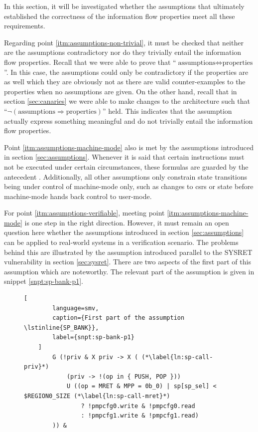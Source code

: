 In this section, it will be investigated whether the assumptions that ultimately established the correctness of the information flow properties meet all these requirements.

Regarding point \ref{itm:assumptions-non-trivial}, it must be checked that neither are the assumptions contradictory nor do they trivially entail the information flow properties.
Recall that we were able to prove that \enquote{$ \text{assumptions} \Leftrightarrow \text{properties} $}.
In this case, the assumptions could only be contradictory if the properties are as well which they are obviously not as there are valid counter-examples to the properties when no assumptions are given.
On the other hand, recall that in section \ref{sec:canaries} we were able to make changes to the architecture such that \enquote{$ \neg(\text{assumptions} \Rightarrow \text{properties}) $} held.
This indicates that the assumption actually express something meaningful and do not trivially entail the information flow properties.

Point \ref{itm:assumptions-machine-mode} also is met by the assumptions introduced in section \ref{sec:assumptions}.
Whenever it is said that certain instructions must not be executed under certain circumstances, these formulas are guarded by the antecedent .
Additionally, all other assumptions only constrain state transitions being under control of machine-mode only, such as changes to \glspl{csr} or state before machine-mode hands back control to user-mode.

For point \ref{itm:assumptions-verifiable}, meeting point \ref{itm:assumptions-machine-mode} is one step in the right direction.
However, it must remain an open question here whether the assumptions introduced in section \ref{sec:assumptions} can be applied to real-world systems in a verification scenario.
The problems behind this are illustrated by the  assumption introduced parallel to the SYSRET vulnerability in section \ref{sec:sysret}.
There are two aspects of the first part of this assumption which are noteworthy.
The relevant part of the  assumption is given in snippet \ref{snpt:sp-bank-p1}.

\begin{figure}
    \begin{lstlisting}[
        language=smv,
        caption={First part of the assumption \lstinline{SP_BANK}},
        label={snpt:sp-bank-p1}
    ]
        G (!priv & X priv -> X ( (*\label{ln:sp-call-priv}*)
            (priv -> !(op in { PUSH, POP }))
            U ((op = MRET & MPP = 0b_0) | sp[sp_sel] < $REGION0_SIZE (*\label{ln:sp-call-mret}*)
                ? !pmpcfg0.write & !pmpcfg0.read
                : !pmpcfg1.write & !pmpcfg1.read)
        )) &
    \end{lstlisting}
\end{figure}

